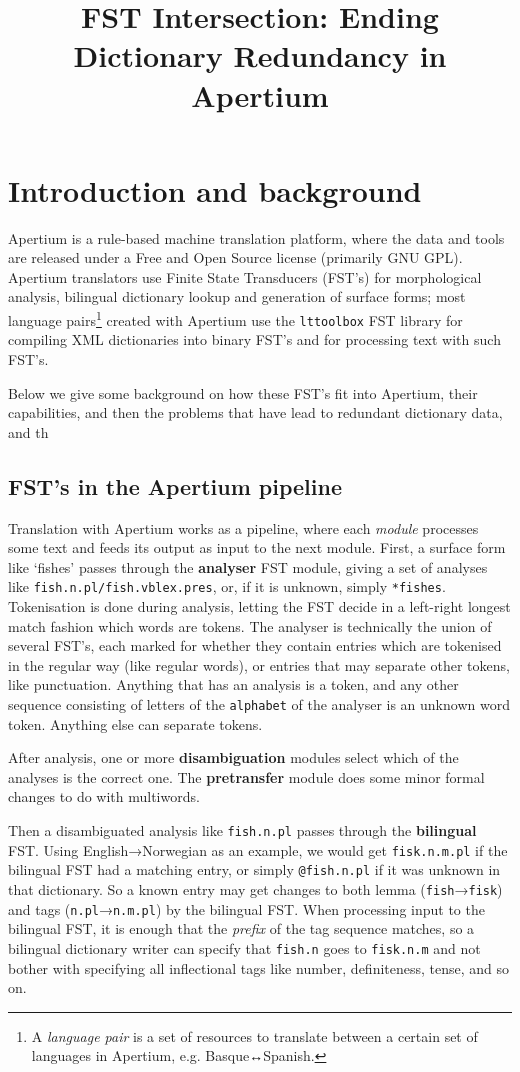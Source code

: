 \documentclass[10pt, a4paper]{article}
\title{FST Intersection: Ending Dictionary Redundancy in Apertium} %
\newcommand{\ana}[1]{\texttt{#1}}
\newcommand{\f}[1]{`#1'}
\newcommand{\tool}[1]{\texttt{#1}}
\begin{document}
\maketitleabstract

\section{Introduction and background}

Apertium \cite{forcada2011afp} is a rule-based machine translation
platform, where the data and tools are released under a Free and Open
Source license (primarily GNU GPL). Apertium translators use Finite
State Transducers (FST's) for morphological analysis, bilingual
dictionary lookup and generation of surface forms; most language
pairs\footnote{A \emph{language pair} is a set of resources to
  translate between a certain set of languages in Apertium, e.g.
  Basque↔Spanish.} created with Apertium use the \tool{lttoolbox}
FST library for compiling XML dictionaries into binary FST's and for
processing text with such FST's.

Below we give some background on how these FST's fit into Apertium,
their capabilities, and then the problems that have lead to redundant
dictionary data, and th

\subsection{FST's in the Apertium pipeline}
\label{sec:pipeline}

Translation with Apertium works as a pipeline, where each
\emph{module} processes some text and feeds its output as input to the
next module. First, a surface form like \f{fishes} passes through the
\textbf{analyser} FST module, giving a set of analyses like
\ana{fish.n.pl/fish.vblex.pres}, or, if it is unknown, simply
\ana{*fishes}. Tokenisation is done during analysis, letting the FST
decide in a left-right longest match fashion which words are tokens.
The analyser is technically the union of several FST's, each marked
for whether they contain entries which are tokenised in the regular
way (like regular words), or entries that may separate other tokens,
like punctuation. Anything that has an analysis is a token, and any
other sequence consisting of letters of the \texttt{alphabet} of the
analyser is an unknown word token. Anything else can separate tokens.

After analysis, one or more \textbf{disambiguation} modules select
which of the analyses is the correct one. The \textbf{pretransfer}
module does some minor formal changes to do with multiwords.

Then a disambiguated analysis like \ana{fish.n.pl} passes through the
\textbf{bilingual} FST. Using English→Norwegian as an example, we
would get \ana{fisk.n.m.pl} if the bilingual FST had a matching entry,
or simply \ana{@fish.n.pl} if it was unknown in that dictionary. So a
known entry may get changes to both lemma (\ana{fish}→\ana{fisk}) and tags
(\ana{n.pl}→\ana{n.m.pl}) by the bilingual FST. When processing input to
the bilingual FST, it is enough that the \emph{prefix} of the tag
sequence matches, so a bilingual dictionary writer can specify that
\ana{fish.n} goes to \ana{fisk.n.m} and not bother with specifying all
inflectional tags like number, definiteness, tense, and so on.
\end{document}
